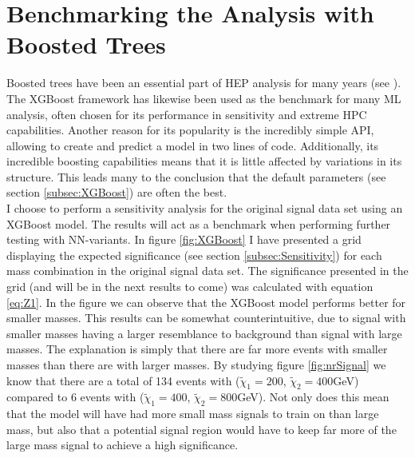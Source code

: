 \section{Benchmarking the Analysis with Boosted Trees}\label{sec:XGBoost}
Boosted trees have been an essential part of \acf{HEP} analysis for many years (see 
\cite{ATLAS-CONF-2011-152,ATLAS-CONF-2017-064}). The XGBoost framework has likewise 
been used as the benchmark for many \ac{ML} analysis, often chosen for its performance in sensitivity and 
extreme \acf{HPC} capabilities. Another reason for its popularity is the incredibly simple \acf{API}, allowing 
to create and predict a model in two lines of code. Additionally, its incredible boosting capabilities means 
that it is little affected by variations in its structure. This leads many to the conclusion that the default 
parameters (see section \ref{subsec:XGBoost}) are often the best. 
\\
I choose to perform a sensitivity analysis for the original signal data set using an XGBoost model. The results
will act as a benchmark when performing further testing with \ac{NN}-variants. In figure \ref{fig:XGBoost} 
I have presented a grid displaying the expected significance (see section \ref{subsec:Sensitivity}) for each 
mass combination in the original signal data set. The significance presented in the grid (and will be in the next results to come) 
was calculated with equation \ref{eq:Z1}. In the figure we can observe that the XGBoost model performs
better for smaller masses. This results can be somewhat counterintuitive, due to signal with smaller masses 
having a larger resemblance to background than signal with large masses. The explanation is simply that there are
far more events with smaller masses than there are with larger masses. By studying figure \ref{fig:nrSignal} we know that 
there are a total of 134 events with ($\tilde{\chi}_1=200$, $\tilde{\chi}_2=400$GeV) compared to 6 events 
with ($\tilde{\chi}_1=400$, $\tilde{\chi}_2=800$GeV). Not only does this mean that the model will have had 
more small mass signals to train on than large mass, but also that a potential signal region would have to keep 
far more of the large mass signal to achieve a high significance.\\
